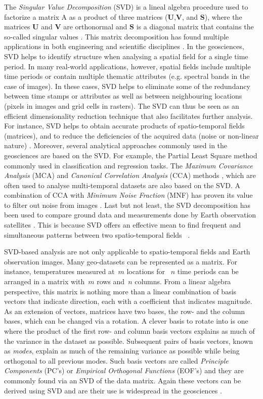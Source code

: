 \documentclass[ijgi,article,submit,moreauthors,pdftex,10pt,a4paper]{Definitions/mdpi}
\def\U{{\mathbf U}}
\def\V{{\mathbf V}}
\def\S{{\mathbf S}}
\begin{document}
The \textit{Singular Value Decomposition} (SVD) is a lineal algebra procedure used to factorize a matrix A as a product of three matrices ($\U$,$\V$, and $\S$), where the matrices $\U$ and $\V$ are orthonormal and $\S$ is a diagonal matrix that contains the so-called singular values \cite{golub70}.
This matrix decomposition has found multiple applications in both engineering and scientific disciplines \cite{Rajwade13,khoshbin16,meuwissen17}. In the geosciences,  SVD helps to identify structure when analysing a spatial field for a single time period. In many real-world applications, however, spatial fields include multiple time periods or contain multiple thematic attributes (e.g. spectral bands in the case of images). In these cases, SVD helps to eliminate some of the redundancy between time stamps or attributes as well as between neighbouring locations (pixels in images and grid cells in rasters). The SVD can thus be seen as an efficient dimensionality reduction technique that also facilitates further analysis. For instance, SVD helps to obtain accurate products of spatio-temporal fields (matrices), and to reduce the deficiencies of the acquired data (noise or non-linear nature) \cite{izquierdo17}. Moreover, several analytical approaches commonly used in the geosciences are based on the SVD. For example, the Partial Least Square method commonly used in classification \cite{izquierdo14} and regression \cite{hansen03} tasks. The \textit{Maximum Covariance Analysis} (MCA) and \textit{Canonical Correlation Analysis} (CCA) methods \cite{munoz13}, which are often used to analyse multi-temporal datasets are also based on the SVD. A combination of CCA with \textit{Minimum Noise Fraction} (MNF) has proven its value to filter out noise from images \cite{nielsen07}. Last but not least, the SVD decomposition has been used to compare ground data and measurements done by Earth observation satellites \cite{li14,li14b}. This is because SVD offers an effective mean to find frequent and simultaneous patterns between two spatio-temporal fields ~\cite{Eshel2011, Storch1999}. 

SVD-based analysis are not only applicable to spatio-temporal fields and Earth observation images. Many geo-datasets can be represented as a matrix. For instance, temperatures measured at~$m$ locations for ~$n$ time periods can be arranged in a matrix with~$m$ rows and~$n$ columns. From a linear algebra perspective, this matrix is nothing more than a linear combination of basis vectors that indicate direction, each with a coefficient that indicates magnitude. As an extension of vectors, matrices have two bases, the row- and the column bases, which can be changed via a rotation. A clever basis to rotate into is one where the product of the first row- and column basis vectors explains as much of the variance in the dataset as possible. Subsequent pairs of basis vectors, known as \textit{modes}, explain as much of the remaining variance as possible while being orthogonal to all previous modes. Such basis vectors are called \textit{Principle Components} (PC's) or \textit{Empirical Orthogonal Functions} (EOF's) and they are commonly found via an SVD of the data matrix. Again these vectors can be derived using SVD and are their use is widespread in the geosciences \cite{demirel10,hannachi07}.  
\end{document}
